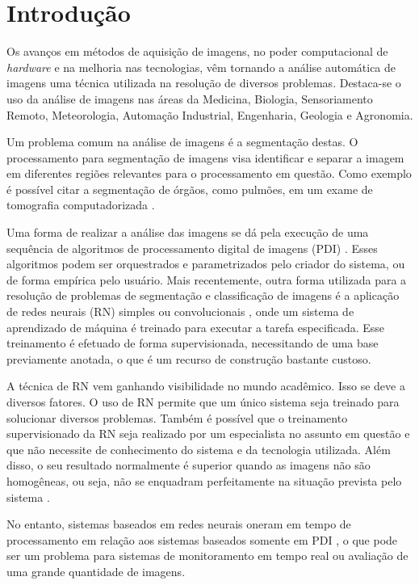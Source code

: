 \documentclass[12pt,oneside,a4paper,english,french,spanish,brazil,]{abntex2}
\begin{document}
\chapter{Introdução}
\label{chap:Introducao}

Os avanços em métodos de aquisição de imagens, no poder computacional de \textit{hardware} e na melhoria nas tecnologias, vêm tornando a análise automática de imagens uma técnica utilizada na resolução de diversos problemas. Destaca-se o uso da análise de imagens nas áreas da Medicina, Biologia, Sensoriamento Remoto, Meteorologia, Automação Industrial, Engenharia, Geologia e Agronomia.  

Um problema comum na análise de imagens é a segmentação destas. O processamento para segmentação de imagens visa identificar e separar a imagem em diferentes regiões relevantes para o processamento em questão. Como exemplo é possível citar a segmentação de órgãos, como pulmões, em um exame de tomografia computadorizada \cite{ronnau:2015}.

Uma forma de realizar a análise das imagens se dá pela execução de uma sequência de algoritmos de processamento digital de imagens (PDI) \cite{gonzalez:2012}. Esses algoritmos podem ser orquestrados e parametrizados pelo criador do sistema, ou de forma empírica pelo usuário. Mais recentemente, outra forma utilizada para a resolução de problemas de segmentação e classificação de imagens é a aplicação de redes neurais (RN) simples ou convolucionais \cite{noh:2015}, onde um sistema de aprendizado de máquina é treinado para executar a tarefa especificada. Esse treinamento é efetuado de forma supervisionada, necessitando de uma base previamente anotada, o que é um recurso de construção bastante custoso.

A técnica de RN vem ganhando visibilidade no mundo acadêmico. Isso se deve a diversos fatores. O uso de RN permite que um único sistema seja treinado para solucionar diversos problemas. Também é possível que o treinamento supervisionado da RN seja realizado por um especialista no assunto em questão e que não necessite de conhecimento do sistema e da tecnologia utilizada. Além disso, o seu resultado normalmente é superior quando as imagens não são homogêneas, ou seja, não se enquadram perfeitamente na situação prevista pelo sistema \cite{pal:1993}.

No entanto, sistemas baseados em redes neurais oneram em tempo de processamento em relação aos sistemas baseados somente em PDI \cite{huang:1992}, o que pode ser um problema para sistemas de monitoramento em tempo real ou avaliação de uma grande quantidade de imagens.
\end{document}
